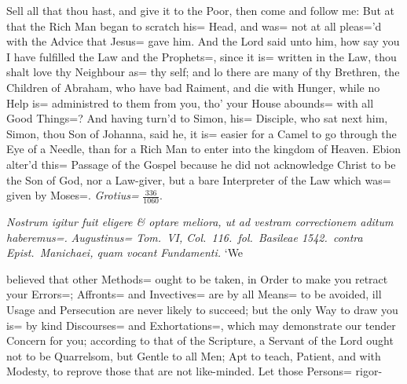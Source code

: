 \newpage
{}
\label{place:EI2}
\marginpar{\color{red}\pageref{place:EI1}}
Sell all that thou hast, and give it to the Poor, then come and follow me:
But at that the Rich Man began to scratch his= Head,
and was= not at all pleas='d with the Advice that Jesus= gave him.
And the Lord said unto him, how say you I have fulfilled the Law and the Prophets=,
since it is= written in the Law, thou shalt love thy Neighbour as= thy self;
and lo there are many of thy Brethren, the Children of Abraham, who have bad Raiment,
and die with Hunger, while no Help is= administred to them from you,
tho' your House abounds= with all Good Things=?
And having turn'd to Simon, his= Disciple, who sat next him, Simon, thou Son of Johanna,
said he, it is= easier for a Camel to go through the Eye of a Needle,
than for a Rich Man to enter into the kingdom of Heaven.
Ebion alter'd this= Passage of the Gospel because he did not acknowledge Christ to be the Son of God,
nor a Law-giver, but a bare Interpreter of the Law which was= given by Moses=.
\emph{Grotius=} {\tiny$\displaystyle\frac{336}{1060}$}.
\vfill

\cleardoublepage
\leavevmode\thispagestyle{empty}\newpage
{}
\textit{Nostrum igitur fuit eligere \& optare meliora,
ut ad vestram correctionem aditum haberemus=.}
\textit{Augustinus= Tom.\ VI, Col.\ 116.\ fol.\ Basileae 1542.\
contra Epist.\ Manichaei, quam vocant Fundamenti.} `We\\[-0.75\thefontsize]

\nointerlineskip
\begin{minipage}[b]{0.9\textwidth}
\noindent
\begin{internallinenumbers}
    believed that other Methods= ought to be taken,
    in Order to make you retract your Errors=;
    Affronts= and Invectives= are by all Means= to be avoided,
    ill Usage and Persecution are never likely to succeed;
    but the only Way to draw you is= by kind Discourses= and Exhortations=,
    which may demonstrate our tender Concern for you;
    according to that of the Scripture,
    a Servant of the Lord ought not to be Quarrelsom,
    but Gentle to all Men;
    Apt to teach, Patient, and with Modesty,
    to reprove those that are not like-minded.
    Let those Persons= rigor-
\end{internallinenumbers}
\end{minipage}\\[-0.75\thefontsize]

